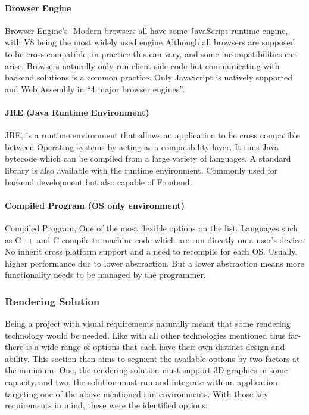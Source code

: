\paragraph{Browser Engine}
Browser Engine’s- Modern browsers all have some JavaScript runtime engine, with V8 being the most widely used engine \cite[]{desktop} \cite[]{v8} Although all browsers are supposed to be cross-compatible, in practice this can vary, and some incompatibilities can arise. Browsers naturally only run client-side code but communicating with backend solutions is a common practice. Only JavaScript is natively supported and Web Assembly in “4 major browser engines”. \cite[]{webassembly}

\paragraph{JRE (Java Runtime Environment)}
JRE, is a runtime environment that allows an application to be cross compatible between Operating systems by acting as a compatibility layer. It runs Java bytecode which can be compiled from a large variety of languages. A standard library is also available with the runtime environment. Commonly used for backend development but also capable of Frontend.
\cite[]{amazon_what} \cite[]{oracle_what}

\paragraph{Compiled Program (OS only environment)}
Compiled Program, One of the most flexible options on the list. Languages such as C++ and C compile to machine code which are run directly on a user’s device. No inherit cross platform support and a need to recompile for each OS. Usually, higher performance due to lower abstraction. But a lower abstraction means more functionality needs to be managed by the programmer.

\subsubsection{Rendering Solution}
Being a project with visual requirements naturally meant that some rendering technology would be needed. Like with all other technologies mentioned thus far- there is a wide range of options that each have their own distinct design and ability. This section then aims to segment the available options by two factors at the minimum- One, the rendering solution must support 3D graphics in some capacity, and two, the solution must run and integrate with an application targeting one of the above-mentioned run environments. With those key requirements in mind, these were the identified options:

